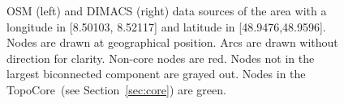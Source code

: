 \documentclass{sig-alternate}
\begin{document}
\begin{figure}
\begin{centering}
\par\end{centering}

\begin{centering}
\par\end{centering}

\begin{centering}
\par\end{centering}


\caption{\label{fig:topo-core}OSM (left) and DIMACS (right)
data sources of the area with a longitude in {[}8.50103, 8.52117{]} and latitude in {[}48.9476,48.9596{]}.
Nodes are drawn at geographical position. Arcs are drawn without direction for clarity.
Non-core nodes are red. Nodes not in the largest biconnected component are grayed out. Nodes in the TopoCore~(see Section~\ref{sec:core}) are green.}
\end{figure}
\end{document}
